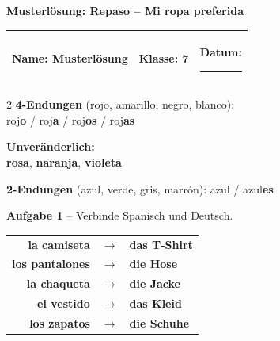 \documentclass[11pt, a4paper]{article}
\newcommand{\fachfarbe}{spanisch}
\newcommand{\thema}{Repaso -- Mi ropa preferida}
\newcommand{\klasse}{7}
\newcommand{\punktebox}[1]{\hfill\fbox{\small #1/#1}}
\newcommand{\luecke}[1]{\rule{#1}{0.4pt}}
\newcommand{\lsg}[1]{\textcolor{loesung}{\textbf{#1}}}
\newcommand{\es}[1]{\textcolor{\fachfarbe}{\textbf{#1}}}
\begin{document}

\begin{center}
    {\Large\bfseries\textcolor{\fachfarbe}{Musterlösung: \thema}}
\end{center}

\vspace{3pt}

\noindent
\begin{tabularx}{\textwidth}{|X|X|X|}
\hline
\textbf{Name:} \lsg{Musterlösung} &
\textbf{Klasse:} \klasse &
\textbf{Datum:} \luecke{2cm} \\
\hline
\end{tabularx}

\vspace{10pt}


\begin{merkkasten}
\small
\begin{multicols}{2}
\textbf{4-Endungen} (rojo, amarillo, negro, blanco):\\
roj\textbf{o} / roj\textbf{a} / roj\textbf{os} / roj\textbf{as}

\columnbreak

\textbf{Unveränderlich:}\\
\es{rosa}, \es{naranja}, \es{violeta}
\end{multicols}

\vspace{2pt}
\textbf{2-Endungen} (azul, verde, gris, marrón): azul / azul\textbf{es}
\end{merkkasten}

\vspace{8pt}


\textbf{\textcolor{\fachfarbe}{Aufgabe 1}} -- Verbinde Spanisch und Deutsch. \punktebox{5}

\vspace{3pt}

\begin{center}
\begin{tabular}{rcl}
\es{la camiseta} & \lsg{$\rightarrow$} & \lsg{das T-Shirt} \\[0.5em]
\es{los pantalones} & \lsg{$\rightarrow$} & \lsg{die Hose} \\[0.5em]
\es{la chaqueta} & \lsg{$\rightarrow$} & \lsg{die Jacke} \\[0.5em]
\es{el vestido} & \lsg{$\rightarrow$} & \lsg{das Kleid} \\[0.5em]
\es{los zapatos} & \lsg{$\rightarrow$} & \lsg{die Schuhe} \\
\end{tabular}
\end{center}
\end{document}
